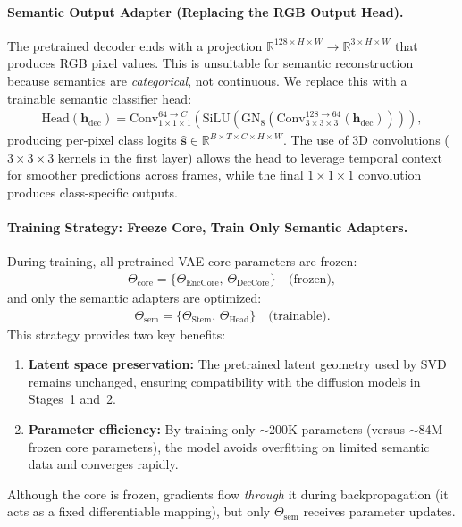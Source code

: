 \paragraph{Semantic Output Adapter (Replacing the RGB Output Head).}
The pretrained decoder ends with a projection $\mathbb{R}^{128 \times H \times W} \rightarrow \mathbb{R}^{3 \times H \times W}$ that produces RGB pixel values. This is unsuitable for semantic reconstruction because semantics are \emph{categorical}, not continuous. We replace this with a trainable semantic classifier head:
\begin{align}
    \text{Head}(\mathbf{h}_{\text{dec}}) = \text{Conv}_{1 \times 1 \times 1}^{64 \rightarrow C}\!\left(\text{SiLU}\!\left(\text{GN}_8\!\left(\text{Conv}_{3 \times 3 \times 3}^{128 \rightarrow 64}(\mathbf{h}_{\text{dec}})\right)\right)\right),
    \label{eq:head}
\end{align}
producing per-pixel class logits $\hat{\mathbf{s}} \in \mathbb{R}^{B \times T \times C \times H \times W}$. The use of 3D convolutions ($3 \times 3 \times 3$ kernels in the first layer) allows the head to leverage temporal context for smoother predictions across frames, while the final $1 \times 1 \times 1$ convolution produces class-specific outputs.

\paragraph{Training Strategy: Freeze Core, Train Only Semantic Adapters.}
During training, all pretrained VAE core parameters are frozen:
\begin{align}
    \Theta_{\text{core}} = \{\Theta_{\text{EncCore}},\, \Theta_{\text{DecCore}}\} \quad \text{(frozen)},
    \label{eq:frozen_params}
\end{align}
and only the semantic adapters are optimized:
\begin{align}
    \Theta_{\text{sem}} = \{\Theta_{\text{Stem}},\, \Theta_{\text{Head}}\} \quad \text{(trainable)}.
    \label{eq:trainable_params}
\end{align}
This strategy provides two key benefits:
\begin{enumerate}
    \item \textbf{Latent space preservation:} The pretrained latent geometry used by SVD remains unchanged, ensuring compatibility with the diffusion models in Stages~1 and~2.
    \item \textbf{Parameter efficiency:} By training only $\sim$200K parameters (versus $\sim$84M frozen core parameters), the model avoids overfitting on limited semantic data and converges rapidly.
\end{enumerate}
Although the core is frozen, gradients flow \emph{through} it during backpropagation (it acts as a fixed differentiable mapping), but only $\Theta_{\text{sem}}$ receives parameter updates.

